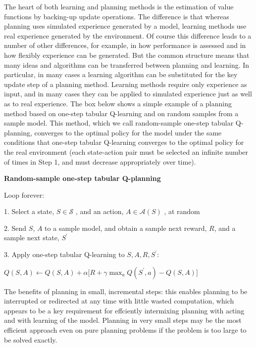 \documentclass{article}
\begin{document}
The heart of both learning and planning methods 
is the estimation of value functions by backing-up update operations. The difference is that whereas planning uses simulated experience generated by a model, 
learning methods use real experience generated by the environment. Of course this difference leads to a number of other differences, for example, in how performance is assessed 
and in how flexibly experience can be generated. But the common structure means that many ideas and algorithms can be transferred between planning and learning. In particular, 
in many cases a learning algorithm can be substituted for the key update step of a planning method. Learning methods require only experience as input, and in many cases they can be applied to simulated experience 
just as well as to real experience. The box below shows a simple example of a planning method based on one-step tabular Q-learning and on random samples from a sample model. 
This method, which we call random-sample one-step tabular Q-planning, converges to the optimal policy for the model under the same conditions that one-step tabular Q-learning converges to the optimal policy 
for the real environment (each state-action pair must be selected an infinite number of times in Step 1, and must decrease appropriately over time).

\textbf{Random-sample one-step tabular Q-planning}

Loop forever:

\hspace{.5cm} 1. Select a state, $S \in { \mathcal { S } }$ , and an action, $A \in { \mathcal { A } } ( S )$ , at random

\hspace{.5cm} 2. Send $S$, $A$ to a sample model, and obtain a sample next reward, $R$, and a sample next state, $S ^ { \prime }$

\hspace{.5cm} 3. Apply one-step tabular Q-learning to $S , A , R , S ^ { \prime }$:

\hspace{1cm} $Q ( S , A ) \leftarrow Q ( S , A ) + \alpha \big [ R + \gamma \operatorname* { m a x } _ { a } Q ( S ^ { \prime } , a ) - Q ( S , A ) \big ]$

The benefits of planning in small, incremental steps: 
this enables planning to be interrupted or redirected at any time with little wasted computation, which appears to be a key requirement for effciently intermixing planning 
with acting and with learning of the model. Planning in very small steps may be the most efficient approach even on pure planning problems if the problem is too large to be solved exactly.
\end{document}
